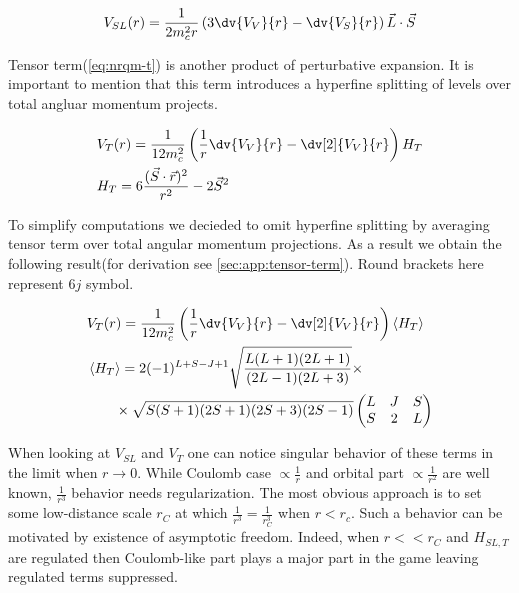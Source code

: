 \begin{align} \label{eq:nrqm-sl}
    V_{SL}(r) = \frac{1}{2 m_c^2 r} \left( 3 \dv{V_V}{r} - \dv{V_S}{r} \right) \vec{L} \cdot \vec{S}
\end{align}

Tensor term(\cref{eq:nrqm-t}) is another product of perturbative expansion. It is important to mention that this term introduces a hyperfine splitting of levels over total angluar momentum projects.

\begin{align} \label{eq:nrqm-t}
    &V_T(r) = \frac{1}{12 m_c^2} \left( \frac{1}{r} \dv{V_V}{r} - \dv[2]{V_V}{r} \right) H_T \\
    &H_T = 6\frac{(\vec{S} \cdot \vec{r})^2}{r^2} - 2\vec{S}^2
\end{align}

To simplify computations we decieded to omit hyperfine splitting by averaging tensor term over total angular momentum projections. As a result we obtain the following result(for derivation see \cref{sec:app:tensor-term}). Round brackets here represent $6j$ symbol.

\begin{align}
    &V_T(r) = \frac{1}{12 m_c^2} \left( \frac{1}{r} \dv{V_V}{r} - \dv[2]{V_V}{r} \right) \left<H_T\right> \\
    &\left<H_T\right> = 2 (-1)^{L+S-J+1} \sqrt{\frac{L(L+1)(2L+1)}{(2L-1)(2L+3)}} \times \nonumber \\
    &\qquad \times \sqrt{S(S+1)(2S+1)(2S+3)(2S-1)} \left( \begin{matrix}
                                                L & J & S \\
                                                S & 2 & L
                                              \end{matrix} \right)
\end{align}

When looking at $V_{SL}$ and $V_T$ one can notice singular behavior of these terms in the limit when $r \rightarrow 0$. While Coulomb case $\propto \frac{1}{r}$ and orbital part $\propto \frac{1}{r^2}$ are well known, $\frac{1}{r^3}$ behavior needs regularization. The most obvious approach is to set some low-distance scale $r_C$ at which $\frac{1}{r^3} = \frac{1}{r_C^3}$ when $r < r_c$. Such a behavior can be motivated by existence of asymptotic freedom. Indeed, when $r << r_C$ and $H_{SL, T}$ are regulated then Coulomb-like part plays a major part in the game leaving regulated terms suppressed.

